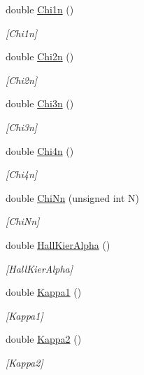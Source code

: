 \begin{DoxyCompactItemize}
double \mbox{\hyperlink{class_molecule_a68d5354a45b3e01b372b1a8052b37a93}{Chi1n}} ()
\begin{DoxyCompactList}\small\item\em \mbox{[}Chi1n\mbox{]} \end{DoxyCompactList}\item 
double \mbox{\hyperlink{class_molecule_a74a0866a08a22793a822d7411e2f3758}{Chi2n}} ()
\begin{DoxyCompactList}\small\item\em \mbox{[}Chi2n\mbox{]} \end{DoxyCompactList}\item 
double \mbox{\hyperlink{class_molecule_ad4e37c52bc0660deeee68e487992e476}{Chi3n}} ()
\begin{DoxyCompactList}\small\item\em \mbox{[}Chi3n\mbox{]} \end{DoxyCompactList}\item 
double \mbox{\hyperlink{class_molecule_a5724983b9e05e85161df48e5c8486d77}{Chi4n}} ()
\begin{DoxyCompactList}\small\item\em \mbox{[}Chi4n\mbox{]} \end{DoxyCompactList}\item 
double \mbox{\hyperlink{class_molecule_a383c34ed1e85d4f07e1f70ee20eeb5ae}{Chi\+Nn}} (unsigned int N)
\begin{DoxyCompactList}\small\item\em \mbox{[}Chi\+Nn\mbox{]} \end{DoxyCompactList}\item 
double \mbox{\hyperlink{class_molecule_ab4440ddc7c396037799a37dcc6fdb497}{Hall\+Kier\+Alpha}} ()
\begin{DoxyCompactList}\small\item\em \mbox{[}Hall\+Kier\+Alpha\mbox{]} \end{DoxyCompactList}\item 
double \mbox{\hyperlink{class_molecule_ae4e3b1f59d36dde20ffded165b417288}{Kappa1}} ()
\begin{DoxyCompactList}\small\item\em \mbox{[}Kappa1\mbox{]} \end{DoxyCompactList}\item 
double \mbox{\hyperlink{class_molecule_a27ded481f6abb14e5531e645713effe3}{Kappa2}} ()
\begin{DoxyCompactList}\small\item\em \mbox{[}Kappa2\mbox{]} \end{DoxyCompactList}\item 

\end{DoxyCompactItemize}
